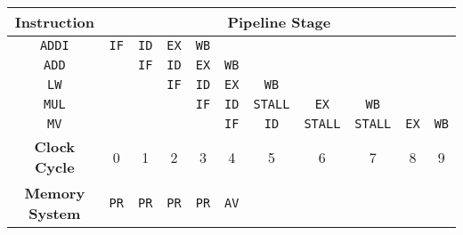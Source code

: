 \begin{tabular}{|*{11}{c|}}
	\hline
	\textbf{Instruction} & \multicolumn{10}{c|}{\textbf{Pipeline Stage}} \\
	\hline
	\texttt{ADDI} & \texttt{IF} & \texttt{ID} & \texttt{EX} & \texttt{WB} & & & & & & 	\\
	\texttt{ADD} & & \texttt{IF} & \texttt{ID} & \texttt{EX} & \texttt{WB} & & & & &	\\
	\texttt{LW} & & & \texttt{IF} & \texttt{ID} & \texttt{EX} & \texttt{WB} & & & &		\\
	\texttt{MUL} & & & & \texttt{IF} & \texttt{ID} & {\color{red}\texttt{STALL}} & \texttt{EX} & \texttt{WB} & &  \\
	\texttt{MV} & & & &  & \texttt{IF} & \texttt{ID} & {\color{red}\texttt{STALL}} & {\color{red}\texttt{STALL}} & \texttt{EX} & \texttt{WB} \\

	\hline
	\hline
	\textbf{Clock Cycle} & 0 & 1 & 2 & 3 & 4 & 5 & 6 & 7 & 8 & 9 \\ 
	\hline
	\hline
	\textbf{Memory System} & \texttt{PR} & \texttt{PR} & \texttt{PR} & \texttt{PR} & \texttt{AV} & & & & & \\
	\hline
\end{tabular}